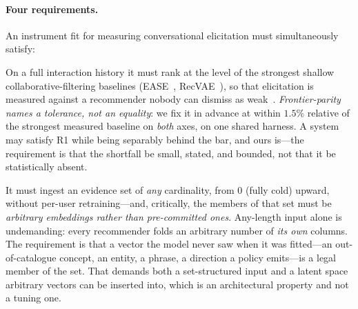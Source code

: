 \documentclass[11pt]{article}
\begin{document}
\paragraph{Four requirements.}
An instrument fit for measuring conversational elicitation must simultaneously satisfy:
\begin{description}[leftmargin=2.4em,itemsep=1.5pt]
  \item[R1 --- frontier-parity full profile.] On a full interaction history it must rank at the level of the strongest shallow
        collaborative-filtering baselines (EASE~\cite{steck2019ease}, RecVAE~\cite{ren2020recvae}), so that
        elicitation is measured against a recommender nobody can dismiss as weak~\cite{dacrema2019progress}.
        \emph{Frontier-parity names a tolerance, not an equality}: we fix it in advance at within $1.5\%$
        relative of the strongest measured baseline on \emph{both} axes, on one shared harness. A system may
        satisfy R1 while being separably behind the bar, and ours is---the requirement is that the shortfall be
        small, stated, and bounded, not that it be statistically absent.
  \item[R2 --- an open set-valued input interface.] It must ingest an evidence set of \emph{any} cardinality, from
        $0$ (fully cold) upward, without per-user retraining---and, critically, the members of that set
        must be \emph{arbitrary embeddings rather than pre-committed ones}. Any-length input alone is undemanding: every
        recommender folds an arbitrary number of \emph{its own} columns. The requirement is that a vector the model
        never saw when it was fitted---an out-of-catalogue concept, an entity, a phrase, a direction a policy
        emits---is a legal member of the set. That demands both a set-structured input and a latent space arbitrary
        vectors can be inserted into, which is an architectural property and not a tuning one.


\end{description}
\end{document}
